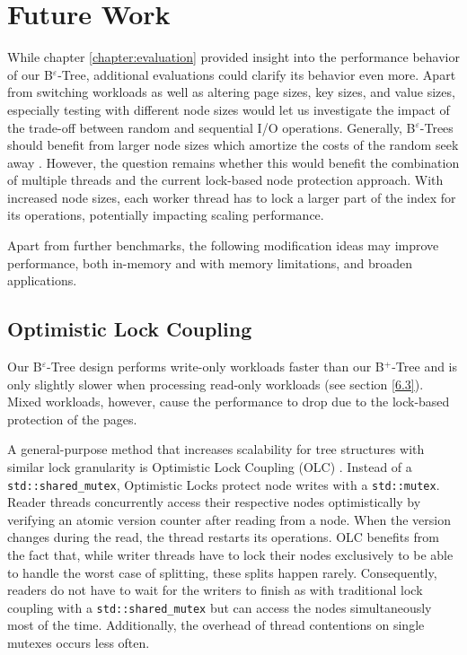 
\chapter{Future Work}\label{chapter:future_work}

While chapter \ref{chapter:evaluation} provided insight into the performance behavior of our B$^\varepsilon$-Tree, additional evaluations could clarify its behavior even more. Apart from switching workloads as well as altering page sizes, key sizes, and value sizes, especially testing with different node sizes would let us investigate the impact of the trade-off between random and sequential I/O operations.\newline
Generally, B$^\varepsilon$-Trees should benefit from larger node sizes which amortize the costs of the random seek away \cite{b_epsilon_tree}. However, the question remains whether this would benefit the combination of multiple threads and the current lock-based node protection approach. With increased node sizes, each worker thread has to lock a larger part of the index for its operations, potentially impacting scaling performance.

Apart from further benchmarks, the following modification ideas may improve performance, both in-memory and with memory limitations, and broaden applications.

\section{Optimistic Lock Coupling}

Our B$^\varepsilon$-Tree design performs write-only workloads faster than our B$^+$-Tree and is only slightly slower when processing read-only workloads (see section \ref{6.3}). Mixed workloads, however, cause the performance to drop due to the lock-based protection of the pages.

A general-purpose method that increases scalability for tree structures with similar lock granularity is Optimistic Lock Coupling (OLC) \cite{optimistic_lock_coupling}. Instead of a \texttt{std::shared\_mutex}, Optimistic Locks protect node writes with a \texttt{std::mutex}. Reader threads concurrently access their respective nodes optimistically by verifying an atomic version counter after reading from a node. When the version changes during the read, the thread restarts its operations. OLC benefits from the fact that, while writer threads have to lock their nodes exclusively to be able to handle the worst case of splitting, these splits happen rarely. Consequently, readers do not have to wait for the writers to finish as with traditional lock coupling with a \texttt{std::shared\_mutex} but can access the nodes simultaneously most of the time. Additionally, the overhead of thread contentions on single mutexes occurs less often.

